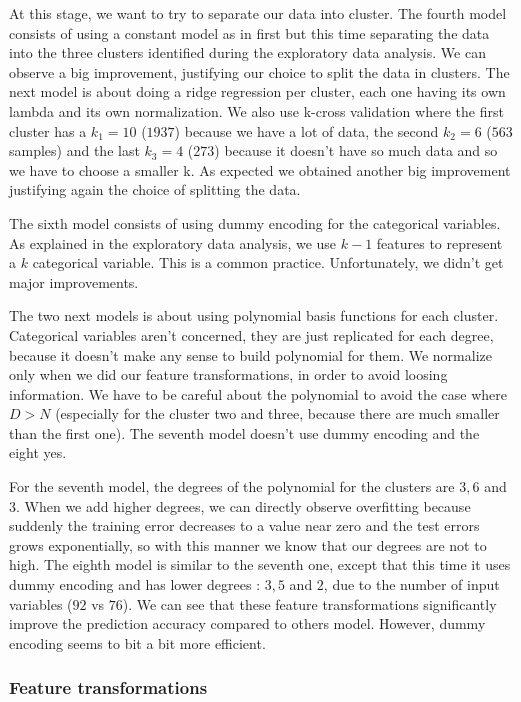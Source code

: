 \documentclass{article} %
\begin{document}
At this stage, we want to try to separate our data into cluster. The fourth model consists of using a constant model as in first but this time separating the data into the three clusters identified during the exploratory data analysis. We can observe a big improvement, justifying our choice to split the data in clusters. The next model is about doing a ridge regression per cluster, each one having its own lambda and its own normalization. We also use k-cross validation where the first cluster has a $k_1=10$ ($1937$) because we have a lot of data, the second $k_2=6$ ($563$ samples) and the last $k_3=4$ ($273$) because it doesn't have so much data and so we have to choose a smaller k. As expected we obtained another big improvement justifying again the choice of splitting the data.

The sixth model consists of using dummy encoding for the categorical variables. As explained in the exploratory data analysis, we use $k-1$ features to represent a $k$ categorical variable. This is a common practice. Unfortunately, we didn't get major improvements.

The two next models is about using polynomial basis functions for each cluster. Categorical variables aren't concerned, they are just replicated for each degree, because it doesn't make any sense to build polynomial for them. We normalize only when we did our feature transformations, in order to avoid loosing information. We have to be careful about the polynomial to avoid the case where $D > N$ (especially for the cluster two and three, because there are much smaller than the first one). The seventh model doesn't use dummy encoding and the eight yes.

For the seventh model, the degrees of the polynomial for the clusters are $3,6$ and $3$. When we add higher degrees, we can directly observe overfitting because suddenly the training error decreases to a value near zero and the test errors grows exponentially, so with this manner we know that our degrees are not to high. The eighth model is similar to the seventh one, except that this time it uses dummy encoding and has lower degrees : $3,5$ and $2$, due to the number of input variables ($92$ vs $76$). We can see that these feature transformations significantly improve the prediction accuracy compared to others model. However, dummy encoding seems to bit a bit more efficient.

\subsubsection{Feature transformations}
\end{document}

